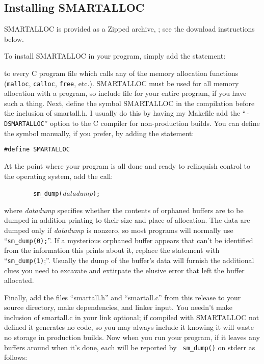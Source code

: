 \subsection{ Installing SMARTALLOC}

SMARTALLOC is provided as a Zipped archive,
; see the
download instructions below.

To install SMARTALLOC in your program, simply add the statement:

to every C program file which calls any of the memory allocation functions
({\tt malloc}, {\tt calloc}, {\tt free}, etc.). SMARTALLOC must be used for
all memory allocation with a program, so include file for your entire program,
if you have such a thing. Next, define the symbol SMARTALLOC in the
compilation before the inclusion of smartall.h. I usually do this by having my
Makefile add the ``{\tt -DSMARTALLOC}'' option to the C compiler for
non-production builds. You can define the symbol manually, if you prefer, by
adding the statement:

{\tt \#define SMARTALLOC}

At the point where your program is all done and ready to relinquish control to
the operating system, add the call:

{\tt \ \ \ \ \ \ \ \ sm\_dump(}{\it datadump}{\tt );}

where {\it datadump} specifies whether the contents of orphaned buffers are to
be dumped in addition printing to their size and place of allocation. The data
are dumped only if {\it datadump} is nonzero, so most programs will normally
use ``{\tt sm\_dump(0);}''. If a mysterious orphaned buffer appears that can't
be identified from the information this prints about it, replace the statement
with ``{\tt sm\_dump(1)};''. Usually the dump of the buffer's data will
furnish the additional clues you need to excavate and extirpate the elusive
error that left the buffer allocated.

Finally, add the files ``smartall.h'' and ``smartall.c'' from this release to
your source directory, make dependencies, and linker input. You needn't make
inclusion of smartall.c in your link optional; if compiled with SMARTALLOC not
defined it generates no code, so you may always include it knowing it will
waste no storage in production builds. Now when you run your program, if it
leaves any buffers around when it's done, each will be reported by {\tt
sm\_dump()} on stderr as follows:

